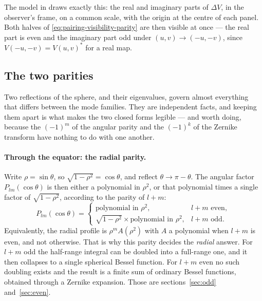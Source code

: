 The model in  draws exactly this: the real and imaginary parts of
$\Delta V$, in the observer's frame, on a common scale, with the origin at the centre of
each panel.  Both halves of \eqref{eq:pairing-visibility-parity} are then visible at once ---
the real part is even and the imaginary part odd under $(u,v) \to (-u,-v)$, since
$V(-u,-v) = V(u,v)^*$ for a real map.

\subsection{The two parities}
\label{sec:parity}

Two reflections of the sphere, and their eigenvalues, govern almost everything that differs
between the mode families.  They are independent facts, and keeping them apart is what makes
the two closed forms legible --- and worth doing, because the $(-1)^m$ of the angular parity and
the $(-1)^k$ of the Zernike transform have nothing to do with one another.

\paragraph{Through the equator: the radial parity.}  Write $\rho = \sin\theta$, so
$\sqrt{1-\rho^2} = \cos\theta$, and reflect $\theta \to \pi - \theta$.  The angular factor
$P_{lm}(\cos\theta)$ is then either a polynomial in $\rho^2$, or that polynomial times a single
factor of $\sqrt{1-\rho^2}$, according to the parity of $l+m$:
\begin{equation}
  P_{lm}(\cos\theta) =
  \begin{cases}
    \text{polynomial in } \rho^2 , & l+m \text{ even} ,\\[2pt]
    \sqrt{1-\rho^2} \times \text{polynomial in } \rho^2 , & l+m \text{ odd} .
  \end{cases}
  \label{eq:parity-dichotomy}
\end{equation}
Equivalently, the radial profile is $\rho^m A(\rho^2)$ with $A$ a polynomial when $l+m$ is
even, and not otherwise.  That is why this parity decides the \emph{radial} answer.  For $l+m$
odd the half-range integral can be doubled into a full-range one, and it then collapses to a
single spherical Bessel function.  For $l+m$ even no such doubling exists and the result is a
finite sum of ordinary Bessel functions, obtained through a Zernike expansion.  Those are
sections~\ref{sec:odd} and~\ref{sec:even}.

